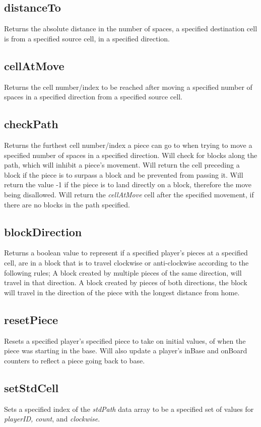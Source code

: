 \documentclass{article}
\begin{document}
\subsection{distanceTo}
Returns the absolute distance in the number of spaces, a specified destination cell is from a specified source cell, in a specified direction.

\subsection{cellAtMove}
Returns the cell number/index to be reached after moving a specified number of spaces in a specified direction from a specified source cell.

\subsection{checkPath}
Returns the furthest cell number/index a piece can go to when trying to move a specified number of spaces in a specified direction. Will check for blocks along the path, which will inhibit a piece's movement. Will return the cell preceding a block if the piece is to surpass a block and be prevented from passing it. Will return the value -1 if the piece is to land directly on a block, therefore the move being disallowed. Will return the \textit{cellAtMove} cell after the specified movement, if there are no blocks in the path specified.

\subsection{blockDirection}
Returns a boolean value to represent if a specified player's pieces at a specified cell, are in a block that is to travel clockwise or anti-clockwise according to the following rules; A block created by multiple pieces of the same direction, will travel in that direction. A block created by pieces of both directions, the block will travel in the direction of the piece with the longest distance from home.

\subsection{resetPiece}
Resets a specified player's specified piece to take on initial values, of when the piece was starting in the base. Will also update a player's inBase and onBoard counters to reflect a piece going back to base.

\subsection{setStdCell}
Sets a specified index of the \textit{stdPath} data array to be a specified set of values for \textit{playerID, count}, and \textit{clockwise}.
\end{document}
